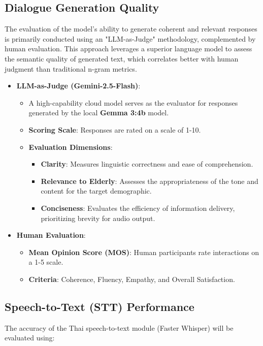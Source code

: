 \subsection{Dialogue Generation Quality}

The evaluation of the model's ability to generate coherent and relevant responses is primarily conducted using an "LLM-as-Judge" methodology, complemented by human evaluation. This approach leverages a superior language model to assess the semantic quality of generated text, which correlates better with human judgment than traditional n-gram metrics.

\begin{itemize}
	\item \textbf{LLM-as-Judge (Gemini-2.5-Flash)}:
	\begin{itemize}
		\item A high-capability cloud model serves as the evaluator for responses generated by the local \textbf{Gemma 3:4b} model.
		\item \textbf{Scoring Scale}: Responses are rated on a scale of 1-10.
		\item \textbf{Evaluation Dimensions}:
		\begin{itemize}
			\item \textbf{Clarity}: Measures linguistic correctness and ease of comprehension.
			\item \textbf{Relevance to Elderly}: Assesses the appropriateness of the tone and content for the target demographic.
			\item \textbf{Conciseness}: Evaluates the efficiency of information delivery, prioritizing brevity for audio output.
		\end{itemize}
	\end{itemize}
	\item \textbf{Human Evaluation}:
	\begin{itemize}
		\item \textbf{Mean Opinion Score (MOS)}: Human participants rate interactions on a 1-5 scale.
		\item \textbf{Criteria}: Coherence, Fluency, Empathy, and Overall Satisfaction.
	\end{itemize}
\end{itemize}

\subsection{Speech-to-Text (STT) Performance}

The accuracy of the Thai speech-to-text module (Faster Whisper) will be evaluated using:

